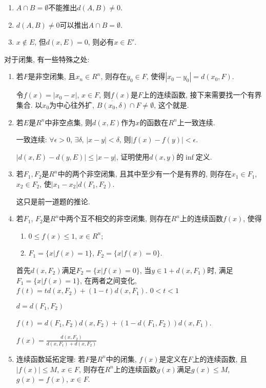 \documentclass[12pt,a4paper,openany]{book}
\begin{document}
\begin{enumerate}
\item $A \cap B = \emptyset$不能推出$d(A, B) \neq 0$.
\item $d(A, B) \neq 0$可以推出$A \cap B = \emptyset$.
\item $x \notin E$, 但$d(x, E) = 0$, 则必有$x \in E'$.
\end{enumerate}

对于闭集, 有一些特殊之处:
\begin{enumerate}
\item 若$F$是非空闭集, 且$x_n \in R^n$, 则存在$y_0 \in F$, 使得$|x_0 - y_0| = d(x_0, F)$.

令$f(x) = |x_0 - x|$, $x \in F$, 则$f(x)$是$F$上的连续函数, 接下来需要找一个有界集合. 以$x_0$为中心往外扩, $\overline{B(x_0, \delta)} \cap F \neq \emptyset$, 这个就是.

\item 若$E$是$R^n$中非空点集, 则$d(x, E)$作为$x$的函数在$R^n$上一致连续.

一致连续: $\forall \epsilon > 0$, $\exists \delta$, $|x - y| < \delta$, 则$|f(x) - f(y)| < \epsilon$.

$|d(x, E) - d(y, E)| \le |x - y|$, 证明使用$d(x, y)$的$\inf$定义.

\item 若$F_1, F_2$是$R^n$中的两个非空闭集, 且其中至少有一个是有界的, 则存在$x_1 \in F_1$, $x_2 \in F_2$, 使$|x_1 - x_2|  d(F_1, F_2)$.

这只是前一道题的推论.

\item 若$F_1$, $F_2$是$R^n$中两个互不相交的非空闭集, 则存在$R^n$上的连续函数$f(x)$, 使得
\begin{enumerate}
\item $0 \le f(x) \le 1$, $x \in R^n$;
\item $F_1 = \{x | f(x) = 1\}$, $F_2 = \{x | f(x) = 0\}$.
\end{enumerate}
首先$d(x, F_2)$满足$F_2 = \{x | f(x) = 0\}$, 当$y \in 1 + d(x, F_1)$时, 满足$F_1 = \{x | f(x) = 1\}$, 在两者之间变化, $f(t) = td(x, F_2) + (1-t)d(x, F_1)$. $0 < t < 1$ 

$d = d(F_1, F_2)$

$f(t) = d(F_1, F_2)d(x, F_2) + (1 - d(F_1, F_2))d(x, F_1)$.

$f(x) = \frac{d(x, F_2)}{d(x, F_1) + d(x, F_2)}$

\item 连续函数延拓定理: 若$F$是$R^n$中的闭集, $f(x)$是定义在$F$上的连续函数, 且$|f(x)| \le M$, $x \in F$, 则存在$R^n$上的连续函数$g(x)$满足$g(x) \le M$, $g(x) = f(x)$, $x \in F$.


\end{enumerate}
\end{document}
